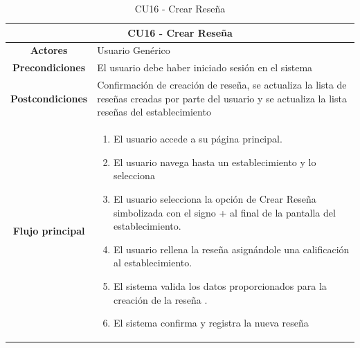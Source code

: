 \begin{table}[h]
    \centering
    \begin{tabular}{|c|p{10cm}|}
        \hline
        \multicolumn{2}{|c|}{\textbf{CU16 - Crear Reseña}}                                                                                                                                \\
        \hline
        \textbf{Actores}         & Usuario Genérico                                                                                                                                       \\
        \hline
        \textbf{Precondiciones}  & El usuario debe haber iniciado sesión en el sistema                                                                                                    \\
        \hline
        \textbf{Postcondiciones} & Confirmación de creación de reseña, se actualiza la lista de reseñas creadas por parte del usuario y se actualiza la lista reseñas del establecimiento \\
        \hline
        \textbf{Flujo principal} & \begin{enumerate}
                                       \item El usuario accede a su página principal.
                                       \item El usuario navega hasta un establecimiento y lo selecciona
                                       \item El usuario selecciona la opción de Crear Reseña simbolizada con el signo + al final de la pantalla del establecimiento.
                                       \item El usuario rellena la reseña asignándole una calificación al establecimiento.
                                       \item El sistema valida los datos proporcionados para la creación de la reseña .
                                       \item El sistema confirma y registra la nueva reseña
                                   \end{enumerate}                           \\
        \hline
    \end{tabular}
    \caption{CU16 - Crear Reseña }
\end{table}

